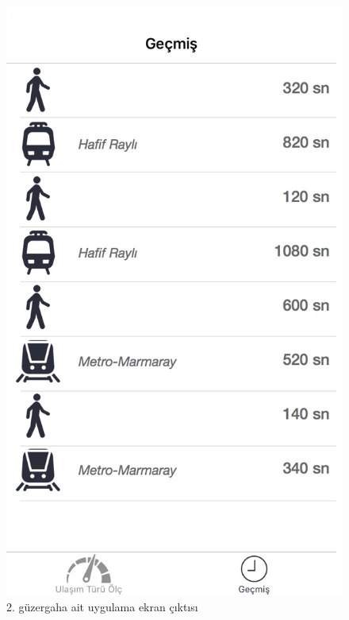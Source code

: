 \begin{figure}[!h]
\centering
\includegraphics[scale=0.3]{projectChapters/images/rota_1.png}
\caption{2. güzergaha ait uygulama ekran çıktısı}
\end{figure}







